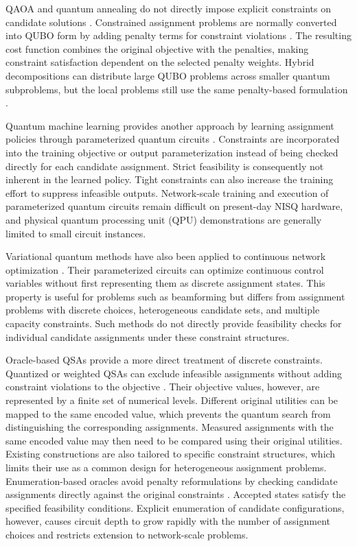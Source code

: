 \documentclass[journal]{IEEEtran}
\begin{document}
{{QAOA and quantum annealing do not directly impose explicit constraints on candidate solutions \cite{farhi2014,lucas2014,kadowaki1998}. Constrained assignment problems are normally converted into QUBO form by
adding penalty terms for constraint violations \cite{zhang2024tnse,wei2024tnse}. The resulting cost function combines the original objective with the penalties, making constraint satisfaction dependent on the selected penalty weights. Hybrid decompositions can distribute large QUBO problems across smaller quantum subproblems, but the local problems still use the same penalty-based formulation \cite{zhang2024tnse,wei2024tnse}.

Quantum machine learning provides another approach by learning assignment policies through parameterized quantum circuits \cite{narottama2022qnn,ansere2024qdrl,ansere2026tnse}. Constraints are incorporated into the training objective or output parameterization instead of being checked directly for each candidate assignment. Strict feasibility is consequently not inherent in the learned policy. Tight constraints can also increase the training effort to suppress infeasible outputs. Network-scale training and execution of parameterized quantum circuits remain difficult on present-day NISQ hardware, and physical quantum processing unit (QPU) demonstrations are generally limited to small circuit instances.

Variational quantum methods have also been applied to continuous network optimization \cite{zhang2024beamforming,sharma2026tnse}. Their parameterized circuits can optimize continuous control variables without first representing them as discrete assignment states. This property is useful for problems such as beamforming but differs from assignment problems with discrete choices, heterogeneous candidate
sets, and multiple capacity constraints. Such methods do not directly provide feasibility checks for individual candidate assignments under these constraint structures.

Oracle-based QSAs provide a more direct treatment of discrete constraints. Quantized or weighted QSAs can exclude infeasible assignments without adding constraint violations to the objective \cite{seo2022}. Their objective values, however, are represented by a finite set of numerical levels. Different original utilities can be
mapped to the same encoded value, which prevents the quantum search from distinguishing the corresponding assignments. Measured assignments with the same encoded value may then need to be compared using their original utilities. Existing constructions are also tailored to specific constraint structures, which limits their use as a common design for heterogeneous assignment problems.
Enumeration-based oracles avoid penalty reformulations by checking candidate assignments directly against the original constraints \cite{jang2025cqf}. Accepted states satisfy the specified feasibility conditions. Explicit enumeration of candidate configurations, however, causes circuit depth to grow rapidly with the number of assignment choices and restricts extension to network-scale problems.

}}
\end{document}
